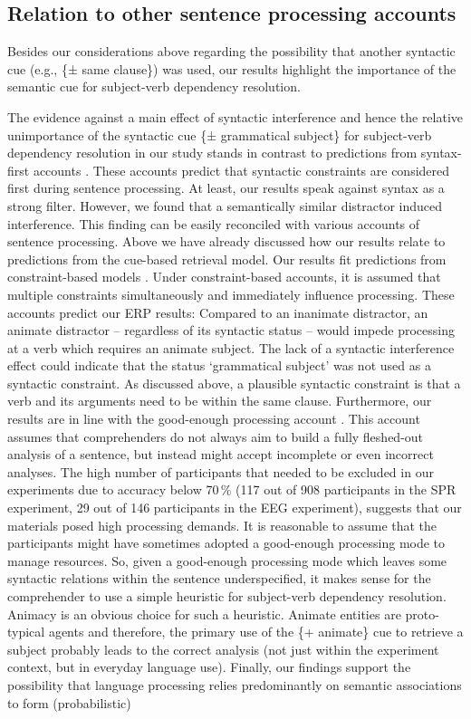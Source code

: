 \documentclass[a4paper, man, floatsintext]{apa7}
\begin{document}
\subsection{Relation to other sentence processing accounts}
Besides our considerations above regarding the possibility that another syntactic cue (e.g., \{± same clause\}) was used, our results highlight the importance of the semantic cue for subject-verb dependency resolution.

The evidence against a main effect of syntactic interference and hence the relative unimportance of the syntactic cue \{± grammatical subject\} for subject-verb dependency resolution in our study stands in contrast to predictions from syntax-first accounts \citep[e.g.,][]{frazier_clifton1996, frazier1979_diss, frazier1987}. These accounts predict that syntactic constraints are considered first during sentence processing. At least, our results speak against syntax as a strong filter. However, we found that a semantically similar distractor induced interference. This finding can be easily reconciled with various accounts of sentence processing. Above we have already discussed how our results relate to predictions from the \citet{Lewis2005} cue-based retrieval model. Our results fit predictions from constraint-based models \citep[e.g.,][]{macdonald1994, mcrae1998modeling, trueswell1993}. Under constraint-based accounts, it is assumed that multiple constraints simultaneously and immediately influence processing. These accounts predict our ERP results: Compared to an inanimate distractor, an animate distractor -- regardless of its syntactic status -- would impede processing at a verb which requires an animate subject. The lack of a syntactic interference effect could indicate that the status `grammatical subject' was not used as a syntactic constraint. As discussed above, a plausible syntactic constraint is that a verb and its arguments need to be within the same clause. Furthermore, our results are in line with the good-enough processing account \citep{ferreira2007goodenough}. This account assumes that comprehenders do not always aim to build a fully fleshed-out analysis of a sentence, but instead might accept incomplete or even incorrect analyses. The high number of participants that needed to be excluded in our experiments due to accuracy below 70\,\% (117 out of 908 participants in the SPR experiment, 29 out of 146 participants in the EEG experiment), suggests that our materials posed high processing demands. It is reasonable to assume that the participants might have sometimes adopted a good-enough processing mode to manage resources. So, given a good-enough processing mode which leaves some syntactic relations within the sentence underspecified, it makes sense for the comprehender to use a simple heuristic for subject-verb dependency resolution. Animacy is an obvious choice for such a heuristic. Animate entities are proto-typical agents \citep{dowty1991thematic} and therefore, the primary use of the \{+ animate\} cue to retrieve a subject probably leads to the correct analysis (not just within the experiment context, but in everyday language use). Finally, our findings support the possibility that language processing relies predominantly on semantic associations to form (probabilistic)
\end{document}
